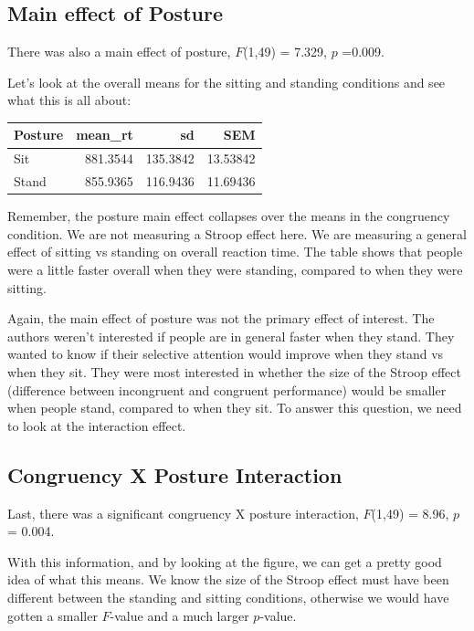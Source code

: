 \documentclass[]{book}
\begin{document}
\hypertarget{main-effect-of-posture}{%
\subsection{Main effect of Posture}\label{main-effect-of-posture}}

There was also a main effect of posture, \(F\)(1,49) = 7.329, \(p\) =0.009.

Let's look at the overall means for the sitting and standing conditions and see what this is all about:

\begin{tabular}{l|r|r|r}
\hline
Posture & mean\_rt & sd & SEM\\
\hline
Sit & 881.3544 & 135.3842 & 13.53842\\
\hline
Stand & 855.9365 & 116.9436 & 11.69436\\
\hline
\end{tabular}

Remember, the posture main effect collapses over the means in the congruency condition. We are not measuring a Stroop effect here. We are measuring a general effect of sitting vs standing on overall reaction time. The table shows that people were a little faster overall when they were standing, compared to when they were sitting.

Again, the main effect of posture was not the primary effect of interest. The authors weren't interested if people are in general faster when they stand. They wanted to know if their selective attention would improve when they stand vs when they sit. They were most interested in whether the size of the Stroop effect (difference between incongruent and congruent performance) would be smaller when people stand, compared to when they sit. To answer this question, we need to look at the interaction effect.

\hypertarget{congruency-x-posture-interaction}{%
\subsection{Congruency X Posture Interaction}\label{congruency-x-posture-interaction}}

Last, there was a significant congruency X posture interaction, \(F\)(1,49) = 8.96, \(p\) = 0.004.

With this information, and by looking at the figure, we can get a pretty good idea of what this means. We know the size of the Stroop effect must have been different between the standing and sitting conditions, otherwise we would have gotten a smaller \(F\)-value and a much larger \(p\)-value.
\end{document}
